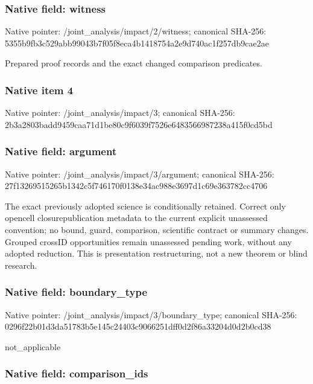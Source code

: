\documentclass[10pt,a4paper]{article}
\begin{document}
\subsubsection{Native field: witness}


Native pointer: /joint\_analysis/impact/2/witness; canonical SHA-256: 5355b9fb3c529abb99043b7f\allowbreak{}05f8eca4b1418754a2e9d740\allowbreak{}ac1f257db9cae2ae


Prepared proof records and the exact changed comparison predicates.


\subsubsection{Native item 4}


Native pointer: /joint\_analysis/impact/3; canonical SHA-256: 2b3a2803badd9459caa71d1b\allowbreak{}e80c9f6039f7526e64835669\allowbreak{}87238a415f0cd5bd



\subsubsection{Native field: argument}


Native pointer: /joint\_analysis/impact/3/argument; canonical SHA-256: 27f13269515265b1342c5f74\allowbreak{}6170f0138e34ac988e3697d1\allowbreak{}c69e363782cc4706


The exact previously adopted science is conditionally retained. Correct only opencell closurepublication metadata to the current explicit unassessed convention; no bound, guard, comparison, scientific contract or summary changes. Grouped crossID opportunities remain unassessed pending work, without any adopted reduction. This is presentation restructuring, not a new theorem or blind research.


\subsubsection{Native field: boundary\_type}


Native pointer: /joint\_analysis/impact/3/boundary\_type; canonical SHA-256: 0296f22b01d3da51783b5e14\allowbreak{}5c24403c9066251dff0d2f86\allowbreak{}a33204d0d2b0cd38


not\_applicable


\subsubsection{Native field: comparison\_ids}
\end{document}
